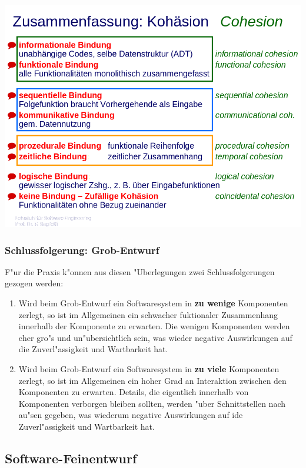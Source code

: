 \includegraphics[scale=0.5]{inc/Softwareentwurf/ZusammenfassungKohaesion.png}


\subsubsection{Schlussfolgerung: Grob-Entwurf}

F"ur die Praxis k"onnen aus diesen "Uberlegungen zwei Schlussfolgerungen gezogen werden:
\begin{enumerate}
    \item Wird beim Grob-Entwurf ein Softwaresystem in \textbf{zu wenige} Komponenten zerlegt, so ist im Allgemeinen ein schwacher fuktionaler Zusammenhang innerhalb der Komponente zu erwarten.
    Die wenigen Komponenten werden eher gro"s und un"ubersichtlich sein, was wieder negative Auswirkungen auf die Zuverl"assigkeit und Wartbarkeit hat.
    \item Wird beim Grob-Entwurf ein Softwaresystem in \textbf{zu viele} Komponenten zerlegt, so ist im Allgemeinen ein hoher Grad an Interaktion zwischen den Komponenten zu erwarten.
    Details, die eigentlich innerhalb von Komponenten verborgen bleiben sollten, werden "uber Schnittstellen nach au"sen gegeben, was wiederum negative Auswirkungen auf ide Zuverl"assigkeit und Wartbarkeit hat.
\end{enumerate}



\subsection{Software-Feinentwurf}







